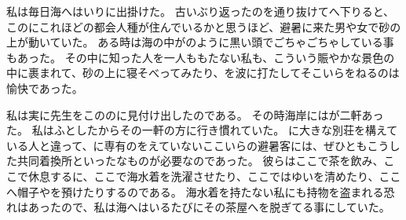 \documentclass[uplatex,
  tate, %
  book,
  onecolumn, %
  paper=a6,  %
  twoside,
  openany,
  fontsize=9pt,       %
  jafontsize=9pt,     %
  number_of_lines=14, %
  line_length=35zh,   %
  baselineskip=16pt,  %
  hanging_punctuation,
]{jlreq}
\begin{document}
私は毎日海へはいりに出掛けた。
古いぶり返ったのを通り抜けてへ下りると、このにこれほどの都会人種が住んでいるかと思うほど、避暑に来た男や女で砂の上が動いていた。
ある時は海の中がのように黒い頭でごちゃごちゃしている事もあった。
その中に知った人を一人ももたない私も、こういう賑やかな景色の中に裹まれて、砂の上に寝そべってみたり、を波に打たしてそこいらをねるのは愉快であった。

私は実に先生をこののに見付け出したのである。
その時海岸にはが二軒あった。
私はふとしたからその一軒の方に行き慣れていた。
に大きな別荘を構えている人と違って、に専有のをえていないここいらの避暑客には、ぜひともこうした共同着換所といったなものが必要なのであった。
彼らはここで茶を飲み、ここで休息するに、ここで海水着を洗濯させたり、ここではゆいを清めたり、ここへ帽子やを預けたりするのである。
海水着を持たない私にも持物を盗まれる恐れはあったので、私は海へはいるたびにその茶屋へを脱ぎてる事にしていた。
\end{document}

